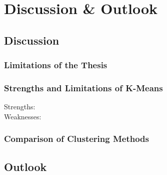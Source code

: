 \chapter{Discussion \& Outlook}
\label{cha:discussion}




\section{Discussion}
\subsection{Limitations of the Thesis}

\subsection{Strengths and Limitations of K-Means}
\begin{description}
    \item[Strengths:]
    \item[Weaknesses:]  
\end{description}
\subsection{Comparison of Clustering Methods}
\section{Outlook}
